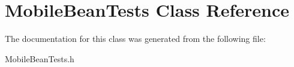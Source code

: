\hypertarget{interface_mobile_bean_tests}{
\section{\-Mobile\-Bean\-Tests \-Class \-Reference}
\label{interface_mobile_bean_tests}
}


\-The documentation for this class was generated from the following file\-:\begin{DoxyCompactItemize}
\item 
\-Mobile\-Bean\-Tests.\-h\end{DoxyCompactItemize}
